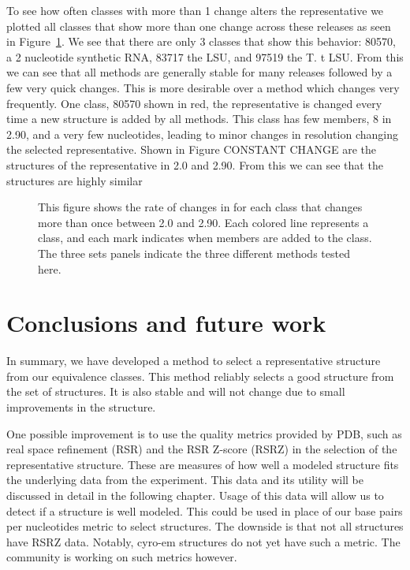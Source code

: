 To see how often classes with more than 1 change alters the representative we
plotted all classes that show more than one change across these releases as seen
in Figure~\ref{fig:multi-change}. We see that there are only 3 classes that show
this behavior: 80570, a 2 nucleotide synthetic RNA, 83717 the \EC{} LSU, and
97519 the T. t LSU. From this we can see that all methods are generally stable
for many releases followed by a few very quick changes. This is more
desirable over a method which changes very frequently. One class, 80570
shown in red, the representative is changed every time a new structure is
added by all methods. This class has few members, 8 in 2.90, and a very
few nucleotides, leading to minor changes in resolution changing the
selected representative. Shown in Figure CONSTANT CHANGE are the
structures of the representative in 2.0 and 2.90. From this we can see
that the structures are highly similar

\begin{figure}
  \caption{This figure shows the rate of changes in for each class that changes
    more than once between 2.0 and 2.90. Each colored line represents a class,
    and each mark indicates when members are added to the class. The three sets
  panels indicate the three different methods tested here.}
  \label{fig:multi-change}
\end{figure}

\section{Conclusions and future work}

In summary, we have developed a method to select a representative structure from
our equivalence classes. This method reliably selects a good structure from the
set of structures. It is also stable and will not change due to small
improvements in the structure.

One possible improvement is to use the quality metrics provided by PDB, such as
real space refinement (RSR) and the RSR Z-score (RSRZ) in the selection of the
representative structure. These are measures of how well a modeled structure
fits the underlying data from the experiment. This data and its utility will be
discussed in detail in the following chapter. Usage of this data will allow us
to detect if a structure is well modeled. This could be used in place of our
base pairs per nucleotides metric to select structures. The downside is that not
all structures have RSRZ data. Notably, cyro-em structures do not yet have such
a metric. The community is working on such metrics however.
